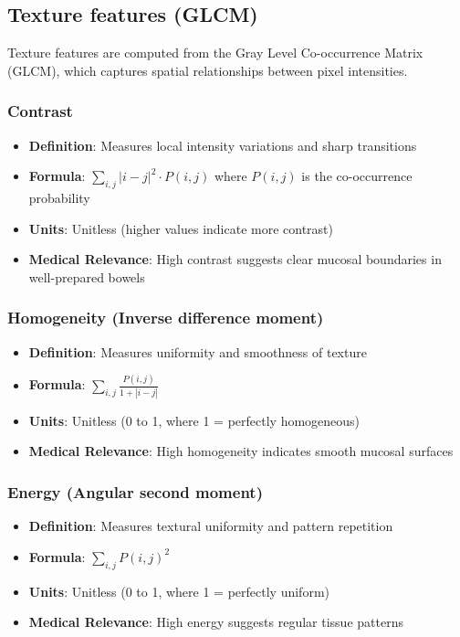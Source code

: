 \documentclass[11pt]{article}
\begin{document}
\subsection{Texture features (GLCM)}

Texture features are computed from the Gray Level Co-occurrence Matrix (GLCM), which captures spatial relationships between pixel intensities.

\subsubsection{Contrast}
\begin{itemize}
    \item \textbf{Definition}: Measures local intensity variations and sharp transitions
    \item \textbf{Formula}: $\displaystyle \sum_{i,j} |i-j|^2 \cdot P(i,j)$ where $P(i,j)$ is the co-occurrence probability
    \item \textbf{Units}: Unitless (higher values indicate more contrast)
    \item \textbf{Medical Relevance}: High contrast suggests clear mucosal boundaries in well-prepared bowels
\end{itemize}

\subsubsection{Homogeneity (Inverse difference moment)}
\begin{itemize}
    \item \textbf{Definition}: Measures uniformity and smoothness of texture
    \item \textbf{Formula}: $\displaystyle \sum_{i,j} \frac{P(i,j)}{1 + |i-j|}$
    \item \textbf{Units}: Unitless (0 to 1, where 1 = perfectly homogeneous)
    \item \textbf{Medical Relevance}: High homogeneity indicates smooth mucosal surfaces
\end{itemize}

\subsubsection{Energy (Angular second moment)}
\begin{itemize}
    \item \textbf{Definition}: Measures textural uniformity and pattern repetition
    \item \textbf{Formula}: $\displaystyle \sum_{i,j} P(i,j)^2$
    \item \textbf{Units}: Unitless (0 to 1, where 1 = perfectly uniform)
    \item \textbf{Medical Relevance}: High energy suggests regular tissue patterns
\end{itemize}
\end{document}
